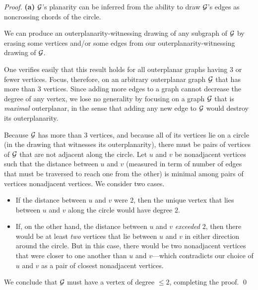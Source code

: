 \begin{proof}
{\bf (a)} $\mbox{$\cal G$}$'s planarity can be inferred from the ability to draw
$\mbox{$\cal G$}$'s edges as noncrossing chords of the circle.

\medskip
{}

 We can produce an outerplanarity-witnessing
drawing of any subgraph of $\mbox{$\cal G$}$ by erasing some vertices and/or some
edges from our outerplanarity-witnessing drawing of $\mbox{$\cal G$}$.

\medskip

 One verifies easily that this result holds for all
outerplanar graphs having $3$ or fewer vertices.  Focus, therefore, on an
arbitrary outerplanar graph $\mbox{$\cal G$}$ that has more than $3$ vertices.  Since
adding more edges to a graph cannot decrease the degree of any vertex,
we lose no generality by focusing on a graph $\mbox{$\cal G$}$ that is {\em maximal}
outerplanar,  in the sense that
adding any new edge to $\mbox{$\cal G$}$ would destroy its outerplanarity.

Because $\mbox{$\cal G$}$ has more than $3$ vertices, and because all of its vertices lie
on a circle (in the drawing that witnesses its outerplanarity), there
must be pairs of vertices of $\mbox{$\cal G$}$ that are not adjacent along the circle.
Let $u$ and $v$ be nonadjacent vertices such that the distance between
$u$ and $v$ (measured in term of number of edges that must be traversed to reach one
from the other) is minimal among pairs of vertices nonadjacent vertices.  We
consider two cases.
\begin{itemize}
\item
If the distance between $u$ and $v$ were $2$, then the unique vertex
that lies between $u$ and $v$ along the circle would have degree $2$.
\item
If, on the other hand, the distance between $u$ and $v$ {\em exceeded}
$2$, then there would be at least {\em two} vertices that lie between $u$
and $v$ in either direction around the circle.  But in this case,
there would be two nonadjacent vertices that were closer to one another
than $u$ and $v$---which contradicts our choice of $u$ and $v$ as a
pair of closest nonadjacent vertices.
\end{itemize}
We conclude that $\mbox{$\cal G$}$ must have a vertex of degree $\leq 2$, completing
the proof.
\qed
\end{proof}

